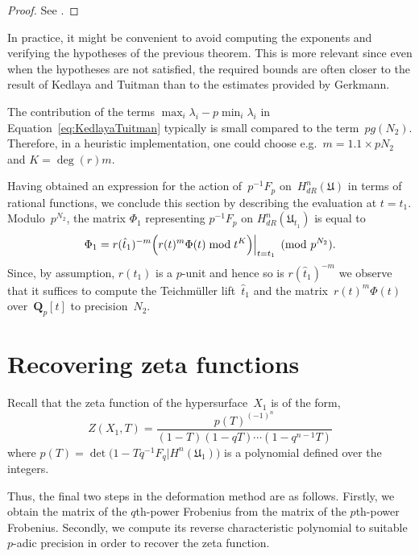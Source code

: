 \begin{proof}
See \citep[Theorem~2.1]{KedlayaTuitman2012}.
\end{proof}

\begin{rem}
In practice, it might be convenient to avoid computing the exponents and 
verifying the hypotheses of the previous theorem.  This is more relevant 
since even when the hypotheses are not satisfied, the required bounds are 
often closer to the result of Kedlaya and Tuitman than to the estimates 
provided by Gerkmann.

The contribution of the terms $\max_i \lambda_i - p \min_i \lambda_i$ 
in Equation~\eqref{eq:KedlayaTuitman} typically is small compared to the 
term~$p g(N_2)$. Therefore, in a heuristic implementation, one 
could choose e.g.\ $m = 1.1 \times p N_2$ and $K = \deg(r) m$.
\end{rem}

Having obtained an expression for the action of~$p^{-1} F_p$ 
on~$H_{dR}^{n}(\mathfrak{U})$ in terms of rational functions, we conclude 
this section by describing the evaluation at $t = t_1$.  Modulo~$p^{N_2}$, 
the matrix $\Phi_1$ representing $p^{-1} F_p$ on 
$H_{dR}^{n}(\mathfrak{U}_{t_1})$ is equal to 
\begin{equation}
\Phi_1 = 
    r(\hat{t}_1)^{-m} 
    \Bigl( r(t)^m \Phi(t) \bmod{t^K} \Bigr) \Big\vert_{t=t_1} \pmod{p^{N_2}}.
\end{equation}
Since, by assumption, $r(t_1)$ is a $p$-unit and hence so is 
$r(\hat{t}_1)^{-m}$ we observe that it suffices to compute the 
Teichm\"uller lift~$\hat{t}_1$ and the matrix~$r(t)^m \Phi(t)$ 
over~$\mathbf{Q}_p[t]$ to precision~$N_2$.

\section{Recovering zeta functions}

Recall that the zeta function of the hypersurface~$X_1$ is of the form,
\begin{equation*}
Z(X_1,T) = \frac{p(T)^{(-1)^n}}{(1 - T) (1 - qT) \dotsm (1 - q^{n-1}T)}
\end{equation*}
where $p(T) = \det \bigl( 1 - T q^{-1} F_q | H^n(\mathfrak{U}_1) \bigr)$ 
is a polynomial defined over the integers.

Thus, the final two steps in the deformation method are as follows.  
Firstly, we obtain the matrix of the $q$th-power Frobenius from the matrix of 
the $p$th-power Frobenius.  Secondly, we compute its reverse characteristic 
polynomial to suitable $p$-adic precision in order to recover the zeta 
function.

